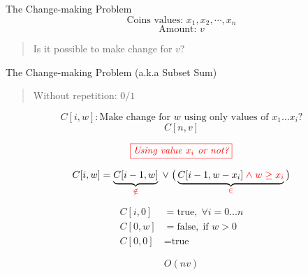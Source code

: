 
\begin{frame}{}
  \centerline{}
\end{frame}

\begin{frame}{}
  \begin{exampleblock}{The Change-making Problem}
    \[
      \text{Coins values: } x_{1}, x_{2}, \cdots, x_{n}
    \]
    \[
      \text{Amount: } v
    \]

    \vspace{0.30cm}
    \begin{quote}
      \centering
      Is it possible to make change for $v$?
    \end{quote}
  \end{exampleblock}

\end{frame}

\begin{frame}{}
  \begin{exampleblock}{The Change-making Problem (a.k.a Subset Sum)}
    \begin{quote}
      \centering
      Without repetition: $0/1$
    \end{quote}
  \end{exampleblock}

  \pause
  \[
    C[i, w]: \text{Make change for $w$ using only values of $x_{1} \dots x_{i}$?}
  \]
  \[
    C[n,v]
  \]

  \pause
  \[
    \textcolor{red}{\fbox{\it Using value $x_{i}$ or not?}}
  \]

  \[
    C[i,w] = \underbrace{C[i-1, w]}_{\textcolor{red}{\notin}} \;\lor\; \big(\underbrace{C[i-1, w-x_{i}] \textcolor{red}{\;\land\; w \ge x_{i}}}_{\textcolor{red}{\in}}\big)
  \]

  \pause
  \begin{align*}
    C[i,0] &= \text{true},  \; \forall i = 0 \dots n  \\
    C[0,w] &= \text{false}, \;\text{if } w > 0 \\
    C[0,0] &= \text{true}
  \end{align*}
  
  \[
    O(nv)
  \]
\end{frame}

